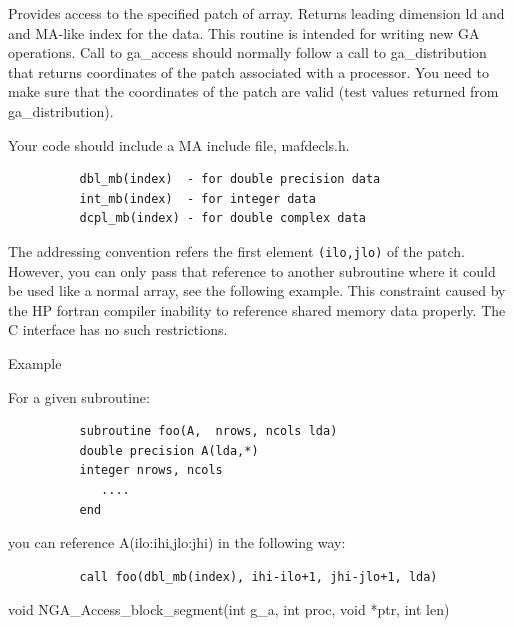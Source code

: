 \documentclass[12pt]{article}
\begin{document}
\begin{fdesc}

  Provides access to the specified patch of array. Returns leading
  dimension ld and and MA-like index for the data. This routine is
  intended for writing new GA operations. Call to ga_access should
  normally follow a call to ga_distribution that returns coordinates
  of the patch associated with a processor. You need to make sure that
  the coordinates of the patch are valid (test values returned from
  ga_distribution).

Your code should include a MA include file, mafdecls.h.
\begin{verbatim}
          dbl_mb(index)  - for double precision data
          int_mb(index)  - for integer data
          dcpl_mb(index) - for double complex data
\end{verbatim}

The addressing convention refers the first element \verb|(ilo,jlo)|
of the patch. However, you can only pass that reference to another
subroutine where it could be used like a normal array, see the
following example. This constraint caused by the HP fortran compiler
inability to reference shared memory data properly. The C interface
has no such restrictions.

Example

For a given subroutine:
\begin{verbatim}
          subroutine foo(A,  nrows, ncols lda)
          double precision A(lda,*)
          integer nrows, ncols
             ....
          end
\end{verbatim}
you can reference A(ilo:ihi,jlo:jhi) in the following way:

\begin{verbatim}
          call foo(dbl_mb(index), ihi-ilo+1, jhi-jlo+1, lda)
\end{verbatim}
\end{fdesc}



\begin{capi}
\begin{ccode}
void NGA_Access_block_segment(int g_a, int proc, void *ptr, int len)
\end{ccode}
\begin{funcargs}
\end{funcargs}
\end{capi}
\end{document}
